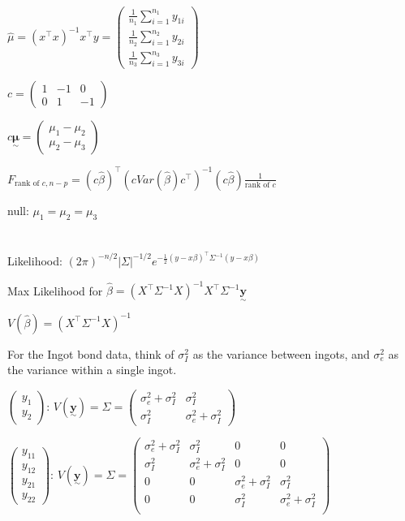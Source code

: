\documentclass{article}
\newcommand{\svec}[1]{\underset{\sim}{\bm{#1}}} %
\let\Oldsum=\sum
\renewcommand{\sum}{\Oldsum\limits}
\begin{document}
$\hat{\mu} = (x^{\top}x)^{-1}x^{\top}y = \begin{pmatrix} \frac{1}{n_1} \sum_{i=1}^{n_1} y_{1i} \\ \frac{1}{n_2} \sum_{i=1}^{n_2} y_{2i} \\ \frac{1}{n_3} \sum_{i=1}^{n_3} y_{3i} \end{pmatrix}$

$c = \begin{pmatrix} 1 & -1 & 0 \\ 0 & 1 & -1 \end{pmatrix}$

$c\svec{\mu} = \begin{pmatrix} \mu_1 - \mu_2 \\ \mu_2 - \mu_3 \end{pmatrix}$

$F_{\text{rank of } c, n-p} = (c\hat{\beta})^{\top}(cVar(\hat{\beta})c^{\top})^{-1}(c\hat{\beta}) \frac{1}{\text{rank of }c}$

null: $\mu_1 = \mu_2 = \mu_3$

\section{}

Likelihood: $(2\pi)^{-n/2}|\Sigma|^{-1/2}e^{-\frac{1}{2}(y-x\beta)^{\top}\Sigma^{-1}(y-x\beta)}$

Max Likelihood for $\hat{\beta} = (X^{\top}\Sigma^{-1}X)^{-1}X^{\top}\Sigma^{-1}\svec{y}$

$V(\hat{\beta}) = (X^{\top}\Sigma^{-1}X)^{-1}$

For the Ingot bond data, think of $\sigma_I^2$ as the variance between ingots, and $\sigma_e^2$ as the variance within a single ingot.

$\begin{pmatrix} y_1 \\ y_2 \end{pmatrix}$: 
$V(\svec{y}) = \Sigma = \begin{pmatrix} 
    \sigma_e^2 + \sigma_I^2 & \sigma_I^2 \\ 
    \sigma_I^2 & \sigma_e^2 + \sigma_I^2 
\end{pmatrix}$

$\begin{pmatrix} y_{11} \\ y_{12} \\ y_{21} \\ y_{22} \end{pmatrix}$: 
$V(\svec{y}) = \Sigma = \begin{pmatrix} 
    \sigma_e^2 + \sigma_I^2 & \sigma_I^2 & 0 & 0 \\ 
    \sigma_I^2 & \sigma_e^2 + \sigma_I^2 & 0 & 0 \\
    0 & 0 & \sigma_e^2 + \sigma_I^2 & \sigma_I^2 \\
    0 & 0 & \sigma_I^2 & \sigma_e^2 + \sigma_I^2 \\
\end{pmatrix}$
\end{document}
